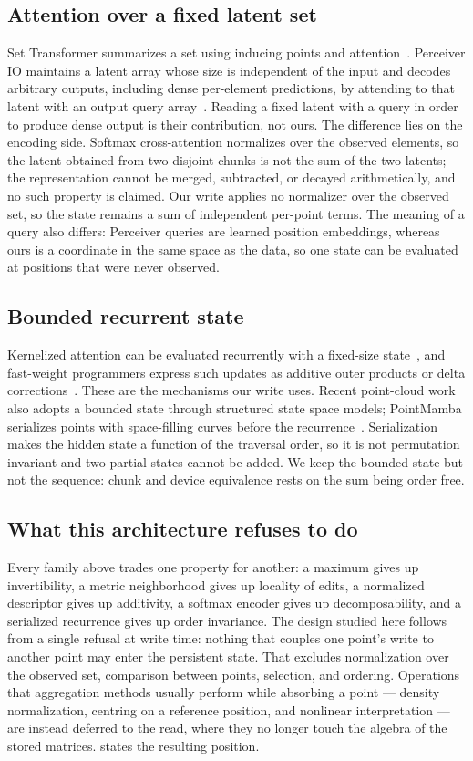\documentclass[11pt,a4paper]{article}
\begin{document}
\subsection{Attention over a fixed latent set}
Set Transformer summarizes a set using inducing points and attention~\cite{lee2019settransformer}. Perceiver IO maintains a latent array whose size is independent of the input and decodes arbitrary outputs, including dense per-element predictions, by attending to that latent with an output query array~\cite{jaegle2022perceiverio}. Reading a fixed latent with a query in order to produce dense output is their contribution, not ours. The difference lies on the encoding side. Softmax cross-attention normalizes over the observed elements, so the latent obtained from two disjoint chunks is not the sum of the two latents; the representation cannot be merged, subtracted, or decayed arithmetically, and no such property is claimed. Our write applies no normalizer over the observed set, so the state remains a sum of independent per-point terms. The meaning of a query also differs: Perceiver queries are learned position embeddings, whereas ours is a coordinate in the same space as the data, so one state can be evaluated at positions that were never observed.

\subsection{Bounded recurrent state}
Kernelized attention can be evaluated recurrently with a fixed-size state~\cite{katharopoulos2020transformers}, and fast-weight programmers express such updates as additive outer products or delta corrections~\cite{schlag2021linear}. These are the mechanisms our write uses. Recent point-cloud work also adopts a bounded state through structured state space models; PointMamba serializes points with space-filling curves before the recurrence~\cite{liang2024pointmamba}. Serialization makes the hidden state a function of the traversal order, so it is not permutation invariant and two partial states cannot be added. We keep the bounded state but not the sequence: chunk and device equivalence rests on the sum being order free.

\subsection{What this architecture refuses to do}
Every family above trades one property for another: a maximum gives up invertibility, a metric neighborhood gives up locality of edits, a normalized descriptor gives up additivity, a softmax encoder gives up decomposability, and a serialized recurrence gives up order invariance. The design studied here follows from a single refusal at write time: nothing that couples one point's write to another point may enter the persistent state. That excludes normalization over the observed set, comparison between points, selection, and ordering. Operations that aggregation methods usually perform while absorbing a point --- density normalization, centring on a reference position, and nonlinear interpretation --- are instead deferred to the read, where they no longer touch the algebra of the stored matrices.  states the resulting position.
\end{document}

